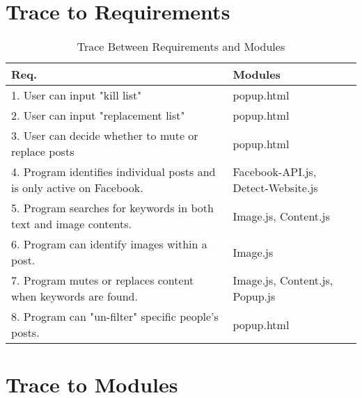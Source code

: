 \documentclass[12pt, titlepage]{article}
\begin{document}
\section{Trace to Requirements}



\begin{table}[H]
\centering
\begin{tabular}{p{} p{}}
\toprule
\textbf{Req.} & \textbf{Modules}\\
\midrule
1. User can input "kill list" &  popup.html\\
2. User can input "replacement list" &  popup.html\\
3. User can decide whether to mute or replace posts &  popup.html\\
4. Program identifies individual posts and is only active on Facebook. &  Facebook-API.js, Detect-Website.js\\ 
5. Program searches for keywords in both text and image contents.  &  Image.js, Content.js\\
6. Program can identify images within a post. &  Image.js\\
7. Program mutes or replaces content when keywords are found. &  Image.js, Content.js, Popup.js\\
8. Program can "un-filter" specific people's posts. &  popup.html\\
\bottomrule
\end{tabular}
\caption{Trace Between Requirements and Modules}
\label{TblRT}
\end{table}
		
\section{Trace to Modules}
\end{document}
